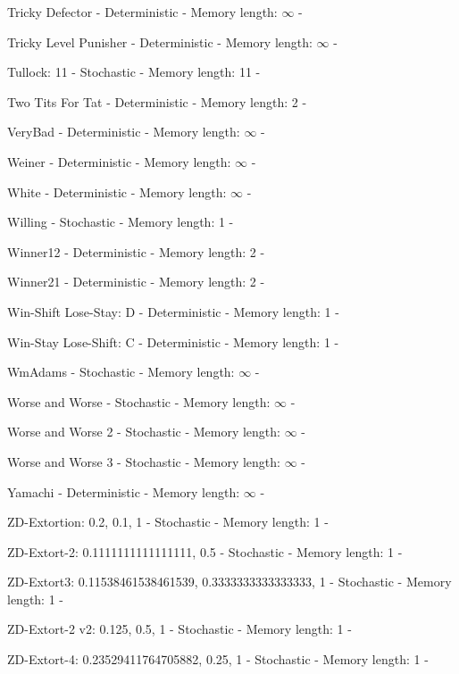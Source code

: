 \item Tricky Defector - Deterministic - Memory length: \(\infty\) - \cite{Knight2018}
\item Tricky Level Punisher - Deterministic - Memory length: \(\infty\) - \cite{Eckhart2015}
\item Tullock: 11 - Stochastic - Memory length: 11 - \cite{Axelrod1980}
\item Two Tits For Tat - Deterministic - Memory length: 2 - \cite{Axelrod1984}
\item VeryBad - Deterministic - Memory length: \(\infty\) - \cite{Andre2013}
\item Weiner - Deterministic - Memory length: \(\infty\) - \cite{Axelrod1980b}
\item White - Deterministic - Memory length: \(\infty\) - \cite{Axelrod1980b}
\item Willing - Stochastic - Memory length: 1 - \cite{Berg2015}
\item Winner12 - Deterministic - Memory length: 2 - \cite{Mathieu2015}
\item Winner21 - Deterministic - Memory length: 2 - \cite{Mathieu2015}
\item Win-Shift Lose-Stay: D - Deterministic - Memory length: 1 - \cite{Li2011}
\item Win-Stay Lose-Shift: C - Deterministic - Memory length: 1 - \cite{Nowak1993, Stewart2012, Kraines1989}
\item WmAdams - Stochastic - Memory length: \(\infty\) - \cite{Axelrod1980b}
\item Worse and Worse - Stochastic - Memory length: \(\infty\) - \cite{Prison1998}
\item Worse and Worse 2 - Stochastic - Memory length: \(\infty\) - \cite{Prison1998}
\item Worse and Worse 3 - Stochastic - Memory length: \(\infty\) - \cite{Prison1998}
\item Yamachi - Deterministic - Memory length: \(\infty\) - \cite{Axelrod1980b}
\item ZD-Extortion: 0.2, 0.1, 1 - Stochastic - Memory length: 1 - \cite{Roemheld2013}
\item ZD-Extort-2: 0.1111111111111111, 0.5 - Stochastic - Memory length: 1 - \cite{Stewart2012}
\item ZD-Extort3: 0.11538461538461539, 0.3333333333333333, 1 - Stochastic - Memory length: 1 - \cite{Press2012}
\item ZD-Extort-2 v2: 0.125, 0.5, 1 - Stochastic - Memory length: 1 - \cite{Kuhn2017}
\item ZD-Extort-4: 0.23529411764705882, 0.25, 1 - Stochastic - Memory length: 1 - \cite{Knight2018}

